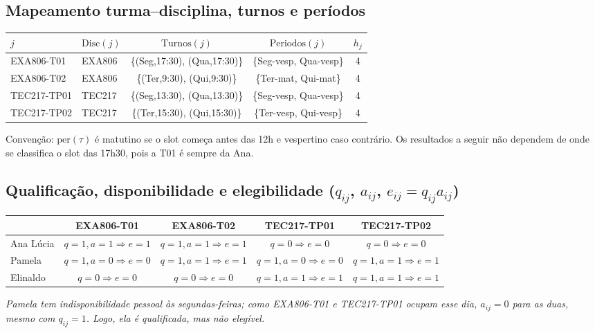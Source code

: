 \documentclass[11pt,a4paper]{article}
\begin{document}
\subsection{Mapeamento turma--disciplina, turnos e períodos}
\begin{center}
\small
\begin{tabular}{llccc}
\toprule
$j$ & $\text{Disc}(j)$ & $\text{Turnos}(j)$ & $\text{Periodos}(j)$ & $h_j$ \\
\midrule
EXA806-T01  & EXA806 & \{(Seg,17:30), (Qua,17:30)\} & \{Seg-vesp, Qua-vesp\} & 4 \\
EXA806-T02  & EXA806 & \{(Ter,9:30), (Qui,9:30)\}   & \{Ter-mat, Qui-mat\}   & 4 \\
TEC217-TP01 & TEC217 & \{(Seg,13:30), (Qua,13:30)\} & \{Seg-vesp, Qua-vesp\} & 4 \\
TEC217-TP02 & TEC217 & \{(Ter,15:30), (Qui,15:30)\} & \{Ter-vesp, Qui-vesp\} & 4 \\
\bottomrule
\end{tabular}
\end{center}
Convenção: $\text{per}(\tau)$ é matutino se o slot começa antes das 12h e vespertino caso contrário. Os resultados a seguir não dependem de onde se classifica o slot das 17h30, pois a T01 é sempre da Ana.

\subsection{Qualificação, disponibilidade e elegibilidade ($q_{ij}$, $a_{ij}$, $e_{ij}=q_{ij}a_{ij}$)}
\begin{center}
\small
\begin{tabular}{lcccc}
\toprule
 & EXA806-T01 & EXA806-T02 & TEC217-TP01 & TEC217-TP02 \\
\midrule
Ana Lúcia & $q{=}1,a{=}1\Rightarrow e{=}1$ & $q{=}1,a{=}1\Rightarrow e{=}1$ & $q{=}0\Rightarrow e{=}0$ & $q{=}0\Rightarrow e{=}0$ \\
Pamela    & $q{=}1,a{=}0\Rightarrow e{=}0$ & $q{=}1,a{=}1\Rightarrow e{=}1$ & $q{=}1,a{=}0\Rightarrow e{=}0$ & $q{=}1,a{=}1\Rightarrow e{=}1$ \\
Elinaldo  & $q{=}0\Rightarrow e{=}0$ & $q{=}0\Rightarrow e{=}0$ & $q{=}1,a{=}1\Rightarrow e{=}1$ & $q{=}1,a{=}1\Rightarrow e{=}1$ \\
\bottomrule
\end{tabular}
\end{center}
\emph{Pamela tem indisponibilidade pessoal às segundas-feiras; como EXA806-T01 e TEC217-TP01 ocupam esse dia, $a_{ij}=0$ para as duas, mesmo com $q_{ij}=1$. Logo, ela é qualificada, mas não elegível.}
\end{document}
